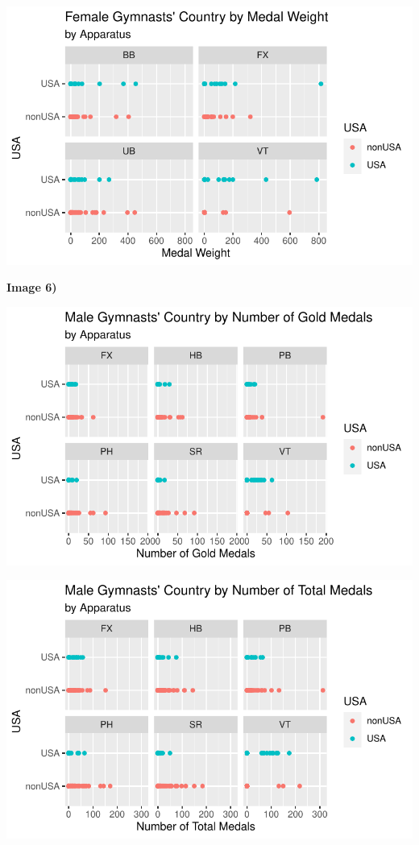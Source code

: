 \documentclass[
  letterpaper,
  DIV=11,
  numbers=noendperiod]{scrartcl}
\begin{document}
\includegraphics{Main_files/figure-pdf/unnamed-chunk-4-3.pdf}

\textbf{Image 6)}

\includegraphics{Main_files/figure-pdf/unnamed-chunk-5-1.pdf}

\includegraphics{Main_files/figure-pdf/unnamed-chunk-5-2.pdf}
\end{document}
